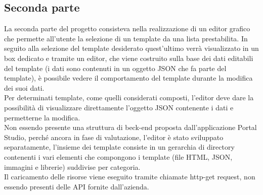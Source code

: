 \subsection{Seconda parte}
La seconda parte del progetto consisteva nella realizzazione di un editor grafico che permette all'utente la selezione di un template da una lista prestabilita.
In seguito alla selezione del template desiderato quest'ultimo verrà visualizzato in un box dedicato e tramite un editor, che viene costruito sulla base dei dati editabili del template (i dati sono contenuti in un oggetto JSON che fa parte del template), è possibile vedere il comportamento del template durante la modifica dei suoi dati.	\\
Per determinati template, come quelli considerati composti, l'editor deve dare la possibilità di visualizzare direttamente l'oggetto JSON contenente i dati e permetterne la modifica.\\
Non essendo presente una struttura di beck-end proposta dall'applicazione Portal Studio, perché ancora in fase di valutazione, l'editor è stato sviluppato separatamente, l'insieme dei template consiste in un gerarchia di directory contenenti i vari elementi che compongono i template (file HTML, JSON, immagini e librerie) suddivise per categoria.\\
Il caricamento delle risorse viene eseguito tramite chiamate http-get request, non essendo presenti delle API fornite dall'azienda.

